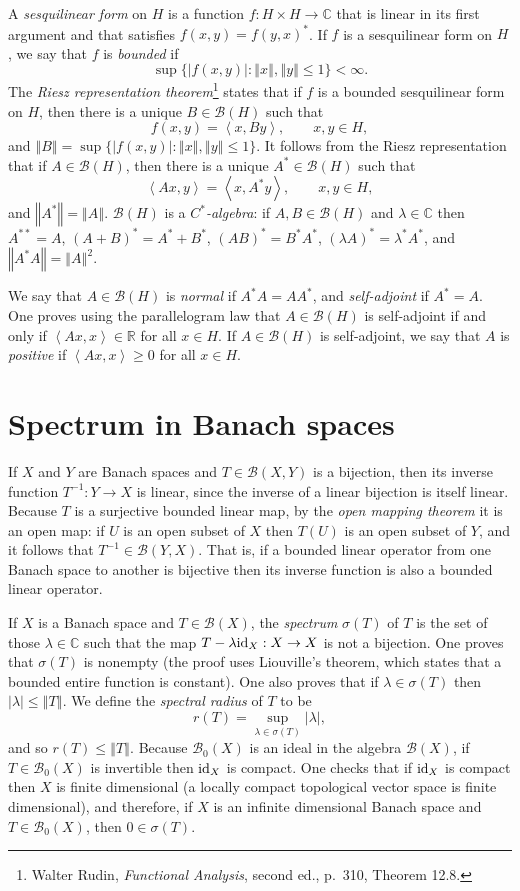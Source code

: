 \documentclass{article}
\newcommand{\inner}[2]{\left\langle #1, #2 \right\rangle}
\newcommand{\id}{\ensuremath\mathrm{id}}
\newcommand{\norm}[1]{\left\Vert #1 \right\Vert}
\theoremstyle{definition}
\begin{document}
A {\em sesquilinear form} on $H$ is a function
$f:H \times H \to \mathbb{C}$ that is linear
in its first argument and  that satisfies $f(x,y)=f(y,x)^*$. If $f$ is a sesquilinear form on $H$, we say that
$f$ is {\em bounded} if
\[
\sup\{|f(x,y)|:\norm{x},\norm{y} \leq 1\} < \infty.
\]
The {\em Riesz representation theorem}\footnote{Walter Rudin, {\em Functional Analysis}, second ed., p.~310, Theorem 12.8.}
 states that if $f$ is a bounded sesquilinear form on $H$, then there is a unique $B 
\in \mathscr{B}(H)$ such that
\[
f(x,y)=\inner{x}{By}, \qquad x,y \in H,
\]
and $\norm{B}=\sup\{|f(x,y)|:\norm{x},\norm{y} \leq 1\}$.
It follows from the Riesz representation that if $A \in \mathscr{B}(H)$, then there is a unique $A^* \in \mathscr{B}(H)$ such that
\[
\inner{Ax}{y}=\inner{x}{A^*y}, \qquad x,y \in H,
\]
and  $\norm{A^*}=\norm{A}$.
$\mathscr{B}(H)$ is a {\em $C^*$-algebra}:
if $A,B \in \mathscr{B}(H)$ and $\lambda \in \mathbb{C}$ then $A^{**}=A$, $(A+B)^*=A^*+B^*$, $(AB)^*=B^*A^*$, $(\lambda A)^*=\lambda^* A^*$,
and $\norm{A^*A}=\norm{A}^2$.

We say that $A \in \mathscr{B}(H)$ is {\em normal} if $A^*A=AA^*$, and 
 {\em self-adjoint} if $A^*=A$. One proves using the parallelogram law that $A \in \mathscr{B}(H)$ is self-adjoint if and only if
$\inner{Ax}{x} \in \mathbb{R}$ for all $x \in H$. If $A \in \mathscr{B}(H)$ is self-adjoint, we say that $A$
is {\em positive} if $\inner{Ax}{x} \geq 0$ for all $x \in H$.




\section{Spectrum in Banach spaces}
If $X$ and $Y$ are Banach spaces and
$T \in \mathscr{B}(X,Y)$ is a bijection, 
then its inverse function $T^{-1}:Y \to X$ is linear, since the inverse of a linear bijection is itself linear. Because $T$ is a surjective bounded linear map,
by the {\em open mapping theorem} it is an open map:
if $U$ is an open subset of $X$ then $T(U)$ is an open subset of $Y$, and it follows that $T^{-1} \in \mathscr{B}(Y,X)$. That is, if a bounded linear operator from one Banach space to another is bijective then its inverse function is also a bounded linear operator. 

If $X$ is a Banach space and $T \in \mathscr{B}(X)$, the {\em spectrum} $\sigma(T)$ of $T$ is the set of those $\lambda \in \mathbb{C}$ such that the map $T-\lambda \id_X:X \to X$ is not a bijection. One proves that $\sigma(T)$ is nonempty (the proof uses Liouville's theorem, which states that a bounded entire function is constant). One also
proves that
if $\lambda \in \sigma(T)$ then $|\lambda| \leq \norm{T}$. We define the {\em spectral radius} of $T$ to be
\[
r(T) = \sup_{\lambda \in \sigma(T)} |\lambda|,
\]
and so
$r(T) \leq \norm{T}$.
Because $\mathscr{B}_0(X)$ is an ideal in the algebra $\mathscr{B}(X)$, if $T \in \mathscr{B}_0(X)$ is invertible then $\id_X$ is compact. One checks that
if $\id_X$ is compact then $X$ is finite dimensional (a locally compact topological vector space is finite dimensional), and 
therefore, if $X$ is an infinite dimensional Banach space and $T \in \mathscr{B}_0(X)$, then $0 \in \sigma(T)$. 
\end{document}
